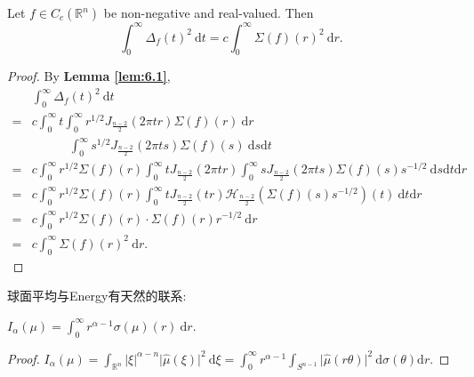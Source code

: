 \begin{proposition}\label{prop:6.3}
Let $f \in C_{c}(\mathbb{R}^{n})$ be non-negative and real-valued. Then
$$
\int _{0}^{\infty}\Delta _{f}(t)^{2}\ \mathrm{d}t=c\int _{0}^{\infty}\Sigma(f)(r)^{2}\ \mathrm{d}r.
$$
\end{proposition}
\begin{proof}
By \textbf{Lemma \ref{lem:6.1}},
$$
\begin{aligned}
 & \int _{0}^{\infty}\Delta _{f}(t)^{2}\ \mathrm{d}t \\
= & c\int _{0}^{\infty}t\int _{0}^{\infty}r^{1/2}J_{\frac{n-2}{2}}(2\pi tr)\Sigma(f)(r)\ \mathrm{d}r \\
 & \qquad \quad \int _{0}^{\infty}s^{1/2}J_{\frac{n-2}{2}}(2\pi ts)\Sigma(f)(s)\ \mathrm{d}s \mathrm{d}t \\
= & c\int _{0}^{\infty}r^{1/2}\Sigma(f)(r)\int _{0}^{\infty}tJ_{\frac{n-2}{2}}(2\pi tr)\int _{0}^{\infty}sJ_{\frac{n-2}{2}}(2 \pi ts)\Sigma(f)(s)s^{-1/2}\ \mathrm{d}s \mathrm{d}t \mathrm{d}r \\
= & c\int _{0}^{\infty}r^{1/2}\Sigma(f)(r)\int _{0}^{\infty}tJ_{\frac{n-2}{2}}(tr)\mathcal{H}_{\frac{n-2}{2}}(\Sigma(f)(s)s^{-1/2})(t)\ \mathrm{d}t \mathrm{d}r \\
= & c\int _{0}^{\infty}r^{1/2}\Sigma(f)(r)\cdot\Sigma(f)(r) r^{-1/2}\ \mathrm{d}r \\
= & c \int _{0}^{\infty}\Sigma(f)(r)^{2}\ \mathrm{d}r.
\end{aligned}$$
\end{proof}

球面平均与Energy有天然的联系:
\begin{lemma}\label{lem:6.4}
$\displaystyle I_{\alpha}(\mu)=\int _{0}^{\infty}r^{\alpha-1}\sigma(\mu)(r)\ \mathrm{d}r.$
\end{lemma}
\begin{proof}
$\displaystyle I_{\alpha}(\mu)=\int _{\mathbb{R}^{n}}\lvert \xi \rvert^{\alpha-n}\lvert \hat{\mu}(\xi) \rvert^{2}\ \mathrm{d}\xi=\int _{0}^{\infty}r^{\alpha-1}\int _{S^{n-1}}\lvert \hat{\mu}(r\theta) \rvert^{2}\ \mathrm{d}\sigma(\theta)\mathrm{d}r.$
\end{proof}

